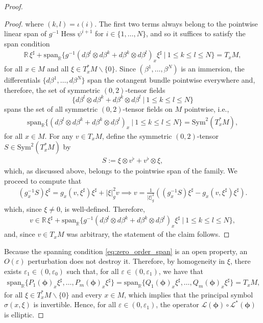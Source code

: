 \documentclass{article}
\theoremstyle{remark}
\newcommand{\M}{M}
\DeclareMathOperator{\Hess}{Hess}
\begin{document}
\begin{proof}
\begin{proof}
%
where $(k,l)=\iota(i)$. The first two terms always belong to the pointwise linear span of $g^{-1}\Hess\psi^{i+1}$ for $i\in\{1,\dots,N\}$, and so it suffices to satisfy the span condition
%
\begin{align*}
    \mathbb{R}\,\xi^\sharp +  \mathrm{span}_{\mathbb{R}}\{g^{-1}(d\beta^l\otimes d\beta^k + d\beta^k\otimes d\beta^l)_x\xi^\sharp~|~1\leq k\leq l \leq N\} = T_x\M,
\end{align*}
%
for all $x\in\M$ and all $\xi\in T_x^*\M\backslash\{0\}.$ Since $(\beta^1,\dots,\beta^N)$ is an immersion, the differentials $\{d\beta^1,\dots,d\beta^N\}$ span the cotangent bundle pointwise everywhere and, therefore, the set of symmetric $(0,2)$-tensor fields 
$$
\{d\beta^l\otimes d\beta^k + d\beta^k\otimes d\beta^l ~|~1\leq k\leq l \leq N\}
$$
%
spans the set of all symmetric $(0,2)$-tensor fields on $\M$ pointwise, i.e., 
%
\begin{align*}
    \mathrm{span}_{\mathbb{R}}\{(d\beta^l\otimes d\beta^k + d\beta^k\otimes d\beta^l)_x~|~1\leq k\leq l \leq N\} = \mathrm{Sym}^2(T_x^*\M),
\end{align*}
%
for all $x\in \M$. For any $v\in T_x\M$, define the symmetric $(0,2)$-tensor $S\in\mathrm{Sym}^2(T_x^*\M)$ by
%
\begin{align*}
    S:= \xi\otimes v^\flat +v^\flat\otimes\xi,
\end{align*}
%
which, as discussed above, belongs to the pointwise span of the family. We proceed to compute that
%
\begin{align*}
    (g_x^{-1}S)\xi^\sharp = g_x(v,\xi^\sharp)\xi^\sharp+|\xi|_g^2v \implies v =  \frac{1}{|\xi|_g^2}((g_x^{-1}S)\xi^\sharp - g_x(v,\xi^\sharp)\xi^\sharp).
\end{align*}
%
which, since $\xi\neq 0$, is well-defined. Therefore, 
%
\begin{align*}
    v\in \mathbb{R}\,\xi^\sharp +  \mathrm{span}_{\mathbb{R}}\{g^{-1}(d\beta^l\otimes d\beta^k + d\beta^k\otimes d\beta^l)_x\xi^\sharp~|~1\leq k\leq l \leq N\},
\end{align*}
%
and, since $v\in T_x\M$ was arbitrary, the statement of the claim follows.
\end{proof} 
%

%
Because the spanning condition \eqref{eq:zero_order_span} is an open property, an $O(\varepsilon)$ perturbation does not destroy it. Therefore, by homogeneity in $\xi$, there exists $\varepsilon_1\in(0,\varepsilon_0)$ such that, for all $\varepsilon\in(0,\varepsilon_{1})$, we have that 
%
\begin{align*}
    \mathrm{span}_{\mathbb{R}}\{P_1(\bm{\phi})_x\xi^\sharp,\dots,P_m(\bm{\phi})_x\xi^\sharp\} = \mathrm{span}_{\mathbb{R}}\{{Q}_1(\bm{\phi})_x\xi^\sharp,\dots,{Q}_m(\bm{\phi})_x\xi^\sharp\} = T_x\M,
\end{align*}
%
for all $\xi\in T^*_x\M\backslash\{0\}$ and every $x\in\M$, which implies that the principal symbol $\sigma(x,\xi)$ is invertible. Hence, for all $\varepsilon\in (0,\varepsilon_{1})$, the operator $\mathcal{L}(\bm{\phi})\circ \mathcal{L}^*(\bm{\phi})$ is elliptic.
%


\end{proof}
\end{document}
